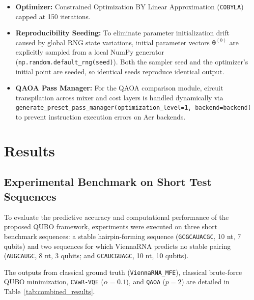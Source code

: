 \documentclass[11pt,a4paper]{article}
\begin{document}
	\begin{itemize}[leftmargin=1.2cm]
		\item \textbf{Optimizer:} Constrained Optimization BY Linear Approximation (\texttt{COBYLA}) capped at 150 iterations.
		\item \textbf{Reproducibility Seeding:} To eliminate parameter initialization drift caused by global RNG state variations, initial parameter vectors $\boldsymbol{\theta}^{(0)}$ are explicitly sampled from a local NumPy generator (\texttt{np.random.default\_rng(seed)}). Both the sampler seed and the optimizer's initial point are seeded, so identical seeds reproduce identical output.
		\item \textbf{QAOA Pass Manager:} For the QAOA comparison module, circuit transpilation across mixer and cost layers is handled dynamically via \texttt{generate\_preset\_pass\_manager(optimization\_level=1, backend=backend)} to prevent instruction execution errors on Aer backends.
	\end{itemize}
	
	\clearpage
	
	\section{Results}
	\label{sec:results}
	
	\subsection{Experimental Benchmark on Short Test Sequences}
	
	To evaluate the predictive accuracy and computational performance of the proposed QUBO framework, experiments were executed on three short benchmark sequences: a stable hairpin-forming sequence (\texttt{GCGCAUACGC}, 10 nt, 7 qubits) and two sequences for which ViennaRNA predicts no stable pairing (\texttt{AUGCAUGC}, 8 nt, 3 qubits; and \texttt{GCAUCGUAGC}, 10 nt, 10 qubits).
	
	The outputs from classical ground truth (\texttt{ViennaRNA\_MFE}), classical brute-force QUBO minimization, \texttt{CVaR-VQE} ($\alpha=0.1$), and \texttt{QAOA} ($p=2$) are detailed in Table~\ref{tab:combined_results}.
	
\end{document}
